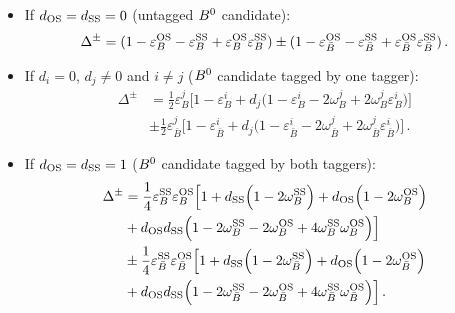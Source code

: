 \begin{itemize}[noitemsep,topsep=0pt]
        \item If $d_{\rm OS}=d_{\rm SS}=0$ (untagged $B^0$ candidate):
        \begin{equation}
        \Delta^{\pm} = (1-\varepsilon_{B}^{\rm OS}-\varepsilon_{B}^{\rm SS}+\varepsilon_{B}^{\rm OS}\varepsilon_{B}^{\rm SS})\pm(1-\varepsilon_{\bar B}^{\rm OS}-\varepsilon_{\bar B}^{\rm SS}+\varepsilon_{\bar B}^{\rm OS}\varepsilon_{\bar B}^{\rm SS})\,. 
        \end{equation}
        \item If $d_{i}=0$, $d_{j}\neq 0$ and $i\neq j$ ($B^0$ candidate tagged by one tagger):
        \begin{equation}
        \begin{split}
        \Delta^{\pm} &= \frac{1}{2}\varepsilon_{B}^{j}\Big[1-\varepsilon_{B}^{i}+d_{j}\Big(1-\varepsilon_{B}^{i}-2\omega_{B}^{j}+2\omega_{B}^{j}\varepsilon_{B}^{i}\Big)\Big] \\
        & \pm \frac{1}{2}\varepsilon_{\bar B}^{j}\Big[1-\varepsilon_{\bar B}^{i}+d_{j}\Big(1-\varepsilon_{\bar B}^{i}-2\omega_{\bar B}^{j}+2\omega_{\bar B}^{j}\varepsilon_{\bar B}^{i}\Big)\Big]\,. 
        \end{split}
        \end{equation}
        \item If $d_{\rm OS}=d_{\rm SS}=1$ ($B^0$ candidate tagged by both taggers):
        \begin{equation}
        \begin{split}
        \Delta^{\pm} &= \frac{1}{4} \varepsilon_{B}^{\rm SS} \varepsilon_{B}^{\rm OS} \Big[1+d_{\rm SS}\Big(1-2\omega_{B}^{\rm SS}\Big)+d_{\rm OS}\Big(1-2\omega_{B}^{\rm OS}\Big)\\
        & +d_{\rm OS}d_{\rm SS}\Big(1-2\omega_{B}^{\rm SS}-2\omega_{B}^{\rm OS}+4\omega_{B}^{\rm SS}\omega_{B}^{\rm OS}\Big)\Big] \\
        & \pm\frac{1}{4}\varepsilon_{\bar B}^{\rm SS}\varepsilon_{\bar B}^{\rm OS}\Big[1+d_{\rm SS}\Big(1-2\omega_{\bar B}^{\rm SS}\Big)+d_{\rm OS}\Big(1-2\omega_{\bar B}^{\rm OS}\Big)\\
        & +d_{\rm OS}d_{\rm SS}\Big(1-2\omega_{\bar B}^{\rm SS}-2\omega_{\bar B}^{\rm OS}+4\omega_{\bar B}^{\rm SS}\omega_{\bar B}^{\rm OS}\Big)\Big]\,.
        \end{split}
        \end{equation} 
\end{itemize}

